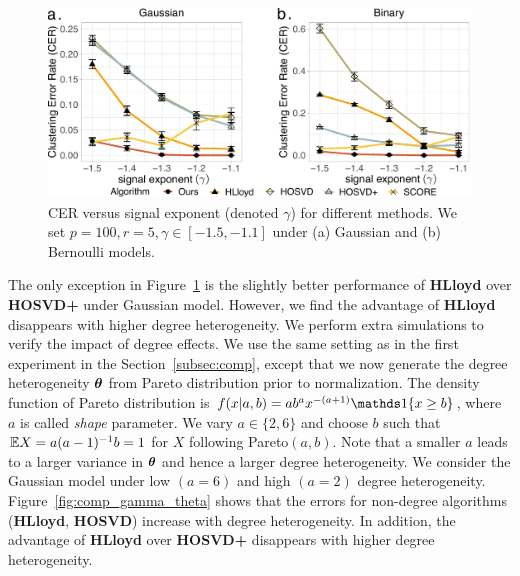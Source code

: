 \documentclass[journal]{IEEEtran}
\theoremstyle{definition}
\theoremstyle{definition}
\begin{document}
\begin{figure}[h!]
    \centering
    \includegraphics[width=\columnwidth]{comp_gamma_anno3.pdf}
    \caption{CER versus signal exponent (denoted $\gamma$) for different methods. We set $p = 100, r = 5, \gamma \in [-1.5, -1.1]$ under (a) Gaussian and (b) Bernoulli models.}
    \label{fig:comp_gamma}
\end{figure}

The only exception in Figure~\ref{fig:comp_gamma} is the slightly better performance of \textbf{\small HLloyd} over \textbf{\small HOSVD+} under Gaussian model. However, we find the advantage of \textbf{\small HLloyd} disappears with higher degree heterogeneity. We perform extra simulations to verify the impact of degree effects. We use the same setting as in the first experiment in the Section~\ref{subsec:comp}, except that we now generate the degree heterogeneity $\boldsymbol{\theta}$ from Pareto distribution prior to normalization. The density function of Pareto distribution is $f(x|a,b) = a b^a x^{-(a+1)} \ind\{ x \geq b \}$, where $a$ is called \emph{shape} parameter. We vary $a \in \{2,6\}$ and choose $b$ such that $\mathbb{E} X = a(a - 1)^{-1}b = 1$ for $X$ following Pareto$(a,b)$. Note that a smaller $a$ leads to a larger variance in $\boldsymbol{\theta}$ and hence a larger degree heterogeneity. We consider the Gaussian model under low $(a = 6)$ and high $(a = 2)$ degree heterogeneity. Figure~\ref{fig:comp_gamma_theta} shows that the errors for non-degree algorithms (\textbf{\small HLloyd}, \textbf{\small HOSVD}) increase with degree heterogeneity. In addition, the advantage of \textbf{\small HLloyd} over \textbf{\small HOSVD+} disappears with higher degree heterogeneity. 
\end{document}
